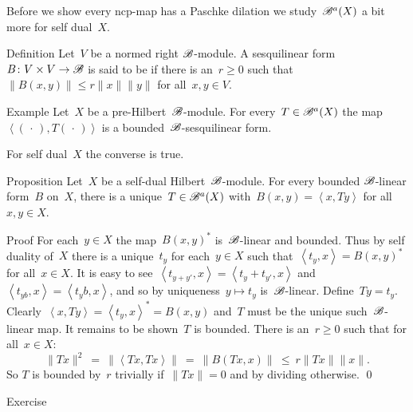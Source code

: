 \documentclass[b]{subfiles}
\begin{document}
\begin{parsec}%
\begin{point}%
    Before we show every ncp-map has a Paschke dilation
        we study~$\mathscr{B}^a(X)$ a bit more for self dual~$X$.
\end{point}
\begin{point}{Definition}%
Let~$V$ be a normed right $\mathscr{B}$-module.
A sesquilinear form~$B\colon V\times V \to \mathscr{B}$
    is said to be 
    if there is an~$r \geq 0$ such that
$\|B(x,y)\| \leq r \|x\|\|y\|$
for all~$x,y \in V$.
\end{point}
\begin{point}{Example}%
Let~$X$ be a pre-Hilbert~$\mathscr{B}$-module.
For every~$T \in \mathscr{B}^a(X)$
    the map~$\left<(\,\cdot\,), T (\,\cdot\,)\right>$
    is a bounded~$\mathscr{B}$-sesquilinear form.
\begin{point}%
    For self dual~$X$ the converse is true.
\end{point}
\end{point}
\begin{point}{Proposition}%
Let~$X$ be a self-dual Hilbert~$\mathscr{B}$-module.
For every bounded $\mathscr{B}$-linear form~$B$ on~$X$,
    there is a unique~$T \in \mathscr{B}^a(X)$
    with~$B(x,y) = \left<x,Ty\right>$
    for all~$x,y \in X$.
\begin{point}{Proof}
For each~$y \in X$
    the map~$B(x,y)^*$ is~$\mathscr{B}$-linear and bounded.
Thus by self duality of~$X$
there is a unique~$t_y$
    for each~$y \in X$
    such that~$\left<t_y, x\right> = B(x,y)^*$
    for all~$x \in X$.
It is easy to see~$\left<t_{y+y'},x\right>
                = \left<t_y + t_{y'}, x\right>$
                and~$\left<t_{yb},x\right>
                = \left<t_y b, x\right>$,
    and so by uniqueness~$y \mapsto t_y$ is~$\mathscr{B}$-linear.
Define~$Ty = t_y$.
Clearly~$\left<x,Ty\right> = \left<t_y,x\right>^* = B(x,y)$
    and~$T$ must be the unique such~$\mathscr{B}$-linear map.
It remains to be shown~$T$ is bounded.
There is an~$r \geq 0$ such that for all~$x \in X$:
\begin{equation*}
    \| Tx\|^2 
    \ =\  \|\left<Tx,Tx\right>\|
            \ =\  \| B (Tx, x) \|
            \ \leq\  r \|Tx\|\|x\|.
\end{equation*}
So $T$ is bounded by~$r$ trivially if~$\|Tx\|=0$
    and by dividing otherwise. \qed
\end{point}
\end{point}
\begin{point}{Exercise}%

\end{point}
\end{parsec}
\end{document}
